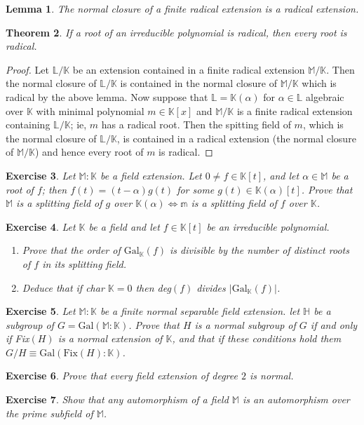 \documentclass{article}
\newtheorem{theorem}{Theorem}[section]
\newtheorem{lemma}[theorem]{Lemma}
\newtheorem{exercise}[theorem]{Exercise}
\begin{document}
\begin{lemma}
The normal closure of a finite radical extension is a radical extension.
\end{lemma}

\begin{theorem}
If a root of an irreducible polynomial is radical, then every root is radical.
\end{theorem}
\begin{proof}
Let $\mathbb{L}/\mathbb{K}$ be an extension contained in a finite radical extension $\mathbb{M}/\mathbb{K}$. Then the normal closure of $\mathbb{L}/\mathbb{K}$ is contained in the normal closure of $\mathbb{M}/\mathbb{K}$ which is radical by the above lemma. Now suppose that $\mathbb{L}=\mathbb{K}(\alpha)$ for $\alpha\in\mathbb{L}$ algebraic over $\mathbb{K}$ with minimal polynomial $m\in\mathbb{K}[x]$ and $\mathbb{M}/\mathbb{K}$ is a finite radical extension containing $\mathbb{L}/\mathbb{K}$; ie, $m$ has a radical root. Then the spitting field of $m$, which is the normal closure of $\mathbb{L}/\mathbb{K}$, is contained in a radical extension (the normal closure of $\mathbb{M}/\mathbb{K}$) and hence every root of $m$ is radical.
\end{proof}


\begin{exercise}
Let $\mathbb{M}:\mathbb{K}$ be a field extension. Let $0\neq f\in\mathbb{K}[t]$, and let $\alpha\in\mathbb{M}$ be a root of $f$; then $f(t)=(t-\alpha)g(t)$ for some $g(t)\in\mathbb{K}(\alpha)[t]$. Prove that $\mathbb{M}$ is a splitting field of $g$ over $\mathbb{K}(\alpha)\iff\mathbb{m}$ is a splitting field of $f$ over $\mathbb{K}$.
\end{exercise}

\begin{exercise}
Let $\mathbb{K}$ be a field and let $f\in\mathbb{K}[t]$ be an irreducible polynomial.
\begin{enumerate}[label=(\roman*)]
    \item Prove that the order of $\text{Gal}_\mathbb{K}(f)$ is divisible by the number of distinct roots of $f$ in its splitting field.
    \item Deduce that if char $\mathbb{K}=0$ then deg$(f)$ divides $|\text{Gal}_\mathbb{K}(f)|$.
\end{enumerate}
\end{exercise}

\begin{exercise}
Let $\mathbb{M}:\mathbb{K}$ be a finite normal separable field extension. let $\mathbb{H}$ be a subgroup of $G=\text{Gal}(\mathbb{M}:\mathbb{K})$. Prove that $H$ is a normal subgroup of $G$ if and only if Fix$(H)$ is a normal extension of $\mathbb{K}$, and that if these conditions hold them $G/H\equiv\text{Gal}(\text{Fix}(H):\mathbb{K})$.
\end{exercise}

\begin{exercise}
Prove that every field extension of degree $2$ is normal.
\end{exercise}

\begin{exercise}
Show that any automorphism of a field $\mathbb{M}$ is an automorphism  over the prime subfield of $\mathbb{M}$.
\end{exercise}
\end{document}
